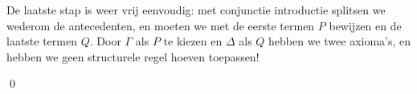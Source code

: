 \begin{example}
\begin{prooftree}
\end{prooftree}

De laatste stap is weer vrij eenvoudig: met conjunctie introductie splitsen we wederom de antecedenten, en moeten we met de eerste termen $P$ bewijzen en de laatste termen $Q$. Door $\Gamma$ als $P$ te kiezen en $\Delta$ als $Q$ hebben we twee axioma's, en hebben we geen structurele regel hoeven toepassen!

\begin{prooftree}
\end{prooftree}
\hfill\qed
\end{example}


